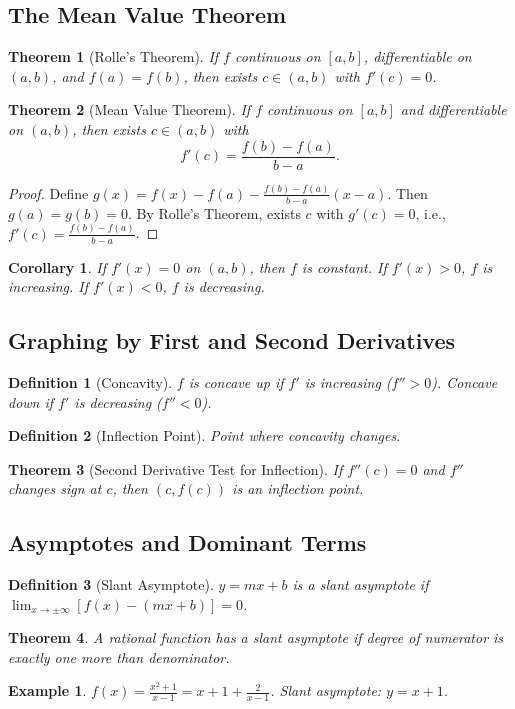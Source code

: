 \documentclass[11pt,a4paper]{article}
\newtheorem{example}{Example}
\newtheorem{theorem}{Theorem}
\newtheorem{definition}{Definition}
\newtheorem{corollary}{Corollary}
\begin{document}
\subsection{The Mean Value Theorem}
\begin{theorem}[Rolle's Theorem]
If $f$ continuous on $[a,b]$, differentiable on $(a,b)$, and $f(a) = f(b)$, then exists $c \in (a,b)$ with $f'(c) = 0$.
\end{theorem}
\begin{theorem}[Mean Value Theorem]
If $f$ continuous on $[a,b]$ and differentiable on $(a,b)$, then exists $c \in (a,b)$ with
\[
f'(c) = \frac{f(b)-f(a)}{b-a}.
\]
\end{theorem}
\begin{proof}
Define $g(x) = f(x) - f(a) - \frac{f(b)-f(a)}{b-a}(x-a)$. Then $g(a) = g(b) = 0$. By Rolle's Theorem, exists $c$ with $g'(c) = 0$, i.e., $f'(c) = \frac{f(b)-f(a)}{b-a}$.
\end{proof}
\begin{corollary}
If $f'(x) = 0$ on $(a,b)$, then $f$ is constant. If $f'(x) > 0$, $f$ is increasing. If $f'(x) < 0$, $f$ is decreasing.
\end{corollary}
\subsection{Graphing by First and Second Derivatives}
\begin{definition}[Concavity]
$f$ is concave up if $f'$ is increasing ($f'' > 0$). Concave down if $f'$ is decreasing ($f'' < 0$).
\end{definition}
\begin{definition}[Inflection Point]
Point where concavity changes.
\end{definition}
\begin{theorem}[Second Derivative Test for Inflection]
If $f''(c) = 0$ and $f''$ changes sign at $c$, then $(c, f(c))$ is an inflection point.
\end{theorem}
\subsection{Asymptotes and Dominant Terms}
\begin{definition}[Slant Asymptote]
$y = mx + b$ is a slant asymptote if $\lim_{x \to \pm\infty}[f(x) - (mx+b)] = 0$.
\end{definition}
\begin{theorem}
A rational function has a slant asymptote if degree of numerator is exactly one more than denominator.
\end{theorem}
\begin{example}
$f(x) = \frac{x^2+1}{x-1} = x+1+\frac{2}{x-1}$. Slant asymptote: $y = x+1$.
\end{example}
\end{document}
